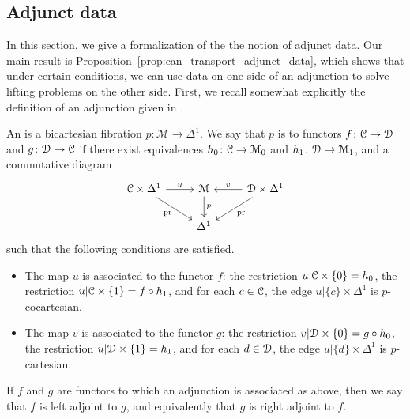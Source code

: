 \documentclass[main.tex]{subfiles}
\begin{document}
\subsection{Adjunct data}
\label{ssc:adjunct_data}

In this section, we give a formalization of the the notion of adjunct data. Our main result is \hyperref[prop:can_transport_adjunct_data]{Proposition~\ref*{prop:can_transport_adjunct_data}}, which shows that under certain conditions, we can use data on one side of an adjunction to solve lifting problems on the other side. First, we recall somewhat explicitly the definition of an adjunction given in \cite{highertopostheory}.

\begin{definition}
  \label{def:adjunction}
  An  is a bicartesian fibration $p\colon \mathcal{M} \to \Delta^{1}$. We say that $p$ is  to functors $f\colon \mathcal{C} \to \mathcal{D}$ and $g\colon \mathcal{D} \to \mathcal{C}$ if there exist equivalences $h_{0}\colon \mathcal{C} \to \mathcal{M}_{0}$ and $h_{1}\colon \mathcal{D} \to \mathcal{M}_{1}$, and a commutative diagram
  \begin{equation*}
    \begin{tikzcd}
      \category{C} \times \Delta^{1}
      \arrow[r, "u"]
      \arrow[dr, swap, "\pr"]
      & \mathcal{M}
      \arrow[d, "p"]
      & \category{D} \times \Delta^{1}
      \arrow[l, swap, "v"]
      \arrow[dl, "\pr"]
      \\
      & \Delta^{1}
    \end{tikzcd}
  \end{equation*}
  such that the following conditions are satisfied. 
  \begin{itemize}
    \item The map $u$ is associated to the functor $f$: the restriction $u|\mathcal{C} \times \{0\} = h_{0}$, the restriction $u|\mathcal{C} \times \{1\} = f \circ h_{1}$, and for each $c \in \mathcal{C}$, the edge $u|\{c\} \times \Delta^{1}$ is $p$-cocartesian.

    \item The map $v$ is associated to the functor $g$: the restriction $v|\mathcal{D} \times \{0\} = g \circ h_{0}$, the restriction $u|\mathcal{D} \times \{1\} = h_{1}$, and for each $d \in \mathcal{D}$, the edge $u|\{d\} \times \Delta^{1}$ is $p$-cartesian.
  \end{itemize}

  If $f$ and $g$ are functors to which an adjunction is associated as above, then we say that $f$ is left adjoint to $g$, and equivalently that $g$ is right adjoint to $f$.
\end{definition}
\end{document}
